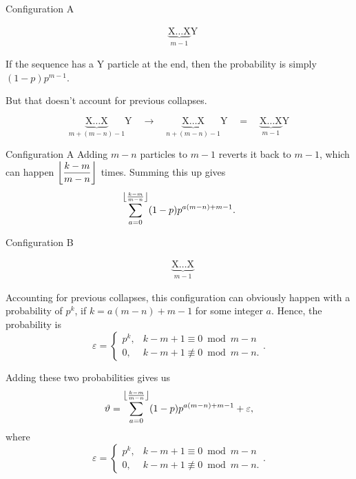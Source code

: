 \documentclass[xcolor={usenames,dvipsnames}]{beamer}
\DeclarePairedDelimiter\floor{\lfloor}{\rfloor}
\begin{document}
\begin{frame}{Configuration A}
    \begin{figure}[H]
    \vspace{-1.5em}
    \begin{align*}
        &\underbrace{\text{X}\dots\text{X}}_{m-1}\text{Y} \tag{A}
    \end{align*}
    \vspace{-2em}
  \end{figure}

  If the sequence has a Y particle at the end, then the probability is simply $(1-p)p^{m-1}$.

  But that doesn't account for previous collapses.
  \begin{figure}[H]
      \vspace{-1.5em}
      \begin{equation*}
        \underbrace{\text{X}\dots\text{X}}_{m + (m-n) - 1}\text{Y} \quad \longrightarrow \quad \underbrace{\text{X}\dots\text{X}}_{n+(m-n)-1}\text{Y}\quad = \quad \underbrace{\text{X}\dots\text{X}}_{m-1}\text{Y} 
      \end{equation*}
      \vspace{-2em}
    \end{figure}
  \end{frame}
  \begin{frame}{Configuration A}
    Adding $m-n$ particles to $m-1$ reverts it back to $m-1$, which can happen $\floor*{\dfrac{k-m}{m-n}}$ times. Summing this up gives \[\sum_{a = 0}^{\floor*{\frac{k-m}{m-n}}} (1-p)p^{a(m-n) + m-1}.\]
\end{frame}
\begin{frame}{Configuration B}
    \begin{figure}[H]
    \vspace{-1.5em}
    \begin{align*}
        &\underbrace{\text{X}\dots\text{X}}_{m-1} \tag{B}
    \end{align*}
    \vspace{-2em}
  \end{figure}
  Accounting for previous collapses, this configuration can obviously happen with a probability of $p^{k}$, if $k = a(m-n) + m-1$ for some integer $a$. Hence, the probability is \[
    \varepsilon = \begin{cases} p^{k}, &k-m+1 \equiv 0 \bmod m-n \\ 0, &k-m+1 \not\equiv 0 \bmod m-n. \end{cases}
  .\] 
\end{frame}
\begin{frame}
  Adding these two probabilities gives us \[
    \vartheta = \sum_{a=0}^{\floor*{\frac{k-m}{m-n}}} (1-p)p^{a(m-n)+m-1} + \varepsilon,
  \] where \[
    \varepsilon = \begin{cases} p^{k}, &k-m+1 \equiv 0 \bmod m-n \\ 0, &k-m+1 \not\equiv 0 \bmod m-n. \end{cases}
  .\] 
\end{frame}
\end{document}
